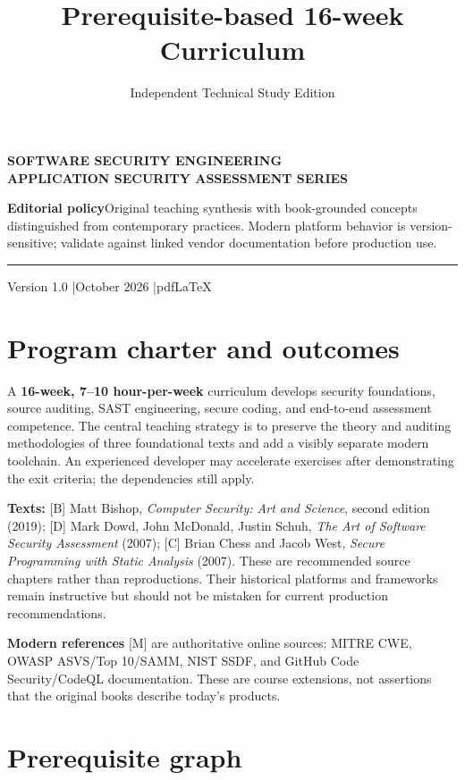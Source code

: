 \documentclass[
  letterpaper,
]{article}
\title{Prerequisite-based 16-week Curriculum}
\author{Independent Technical Study Edition}
\date{}
\makeatletter
\renewcommand{\maketitle}{%
 \hypersetup{pageanchor=false}%
\begin{titlepage}\thispagestyle{empty}
 \vspace*{1.5cm}{\color{brand}\rule{\textwidth}{3pt}}\par\vspace{1cm}
 {\sffamily\bfseries\color{muted}\large SOFTWARE SECURITY ENGINEERING\\ APPLICATION SECURITY ASSESSMENT SERIES}\par\vspace{1.05cm}
 {\sffamily\bfseries\color{ink}\fontsize{27}{34}\selectfont\@title\par}\vspace{0.8cm}
 {\sffamily\large\color{brand}\@author\par}\vfill
 \begin{tcolorbox}[colback=brandlight,colframe=brand!55,boxrule=0.5pt]
 \small\textbf{Editorial policy}\quad Original teaching synthesis with book-grounded concepts distinguished from contemporary practices. Modern platform behavior is version-sensitive; validate against linked vendor documentation before production use.
 \end{tcolorbox}
 {\color{brand}\rule{\textwidth}{2pt}}\par\vspace{0.3cm}
 {\sffamily\small Version 1.0 \quad|\quad October 2026 \quad|\quad pdfLaTeX}\end{titlepage}\hypersetup{pageanchor=true}\setcounter{page}{1}}
\makeatother
\begin{document}
\maketitle

{
\setcounter{tocdepth}{3}
\tableofcontents
}
\section{Program charter and
outcomes}\label{program-charter-and-outcomes}

A \textbf{16-week, 7--10 hour-per-week} curriculum develops security
foundations, source auditing, SAST engineering, secure coding, and
end-to-end assessment competence. The central teaching strategy is to
preserve the theory and auditing methodologies of three foundational
texts and add a visibly separate modern toolchain. An experienced
developer may accelerate exercises after demonstrating the exit
criteria; the dependencies still apply.

\textbf{Texts:} {[}B{]} Matt Bishop, \emph{Computer Security: Art and
Science}, second edition (2019); {[}D{]} Mark Dowd, John McDonald,
Justin Schuh, \emph{The Art of Software Security Assessment} (2007);
{[}C{]} Brian Chess and Jacob West, \emph{Secure Programming with Static
Analysis} (2007). These are recommended source chapters rather than
reproductions. Their historical platforms and frameworks remain
instructive but should not be mistaken for current production
recommendations.

\textbf{Modern references} {[}M{]} are authoritative online sources:
MITRE CWE, OWASP ASVS/Top 10/SAMM, NIST SSDF, and GitHub Code
Security/CodeQL documentation. These are course extensions, not
assertions that the original books describe today's products.

\section{Prerequisite graph}\label{prerequisite-graph}
\end{document}
